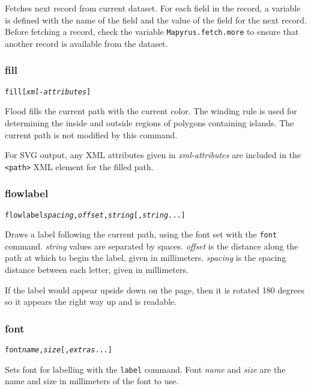Fetches next record from current dataset.
For each field in the record, a variable is defined with the name
of the field and the value of the field for the next record.
Before fetching a record, check the variable
\texttt{Mapyrus.fetch.more}
to ensure that another record is available from the dataset.

\subsubsection{fill}

\begin{alltt}
fill [\textit{xml-attributes}]
\end{alltt}

Flood fills the current path with the current color.
The winding rule is used for determining the inside and outside
regions of polygons containing islands.
The current path is not modified by this command.

For SVG output, any XML attributes given in
\textit{xml-attributes} are
included in the \texttt{<path>} XML element for the filled path.

\subsubsection{flowlabel}

\begin{alltt}
flowlabel \textit{spacing}, \textit{offset}, \textit{string} [, \textit{string} ...]
\end{alltt}

Draws a label following the current path,
using the font set with the \texttt{font} command.
\textit{string} values are
separated by spaces.
\textit{offset} is the distance along the path at which to begin
the label, given in millimeters.
\textit{spacing} is the spacing distance
between each letter, given in millimeters.

If the label would appear upside down on the page, then it is rotated
180 degrees so it appears the right way up and is readable.

\subsubsection{font}

\begin{alltt}
font \textit{name}, \textit{size} [, \textit{extras} ...]
\end{alltt}

Sets font for labelling with the \texttt{label} command.
Font \textit{name} and \textit{size} are the name and size in
millimeters of the font to use.


